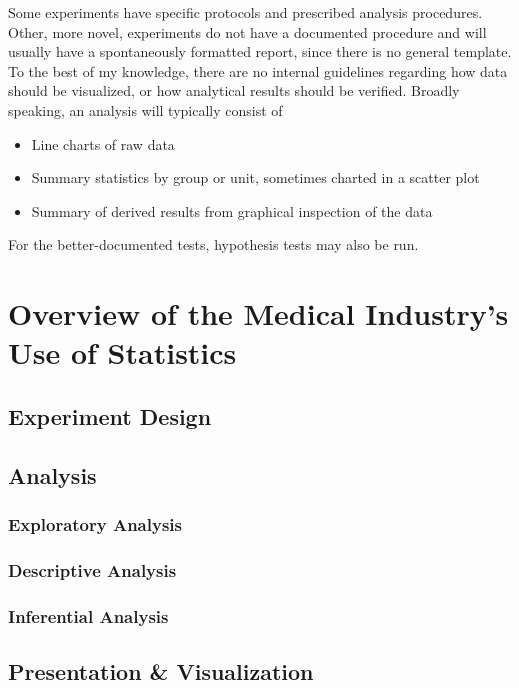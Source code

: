 \documentclass[11pt,a4paper,article]{memoir} %
\begin{document}
 Some experiments have specific protocols and prescribed analysis procedures. Other, more novel, experiments do not have a documented procedure and will usually have a spontaneously formatted report, since there is no general template.  To the best of my knowledge, there are no internal guidelines regarding how data should be visualized, or how analytical results should be verified. Broadly speaking, an analysis will typically consist of
 \begin{itemize}
 	\item Line charts of raw data
 	\item Summary statistics by group or unit, sometimes charted in a scatter plot
 	\item Summary of derived results from graphical inspection of the data
 \end{itemize}
 For the better-documented tests, hypothesis tests may also be run.
\par



\newpage
\chapter{Overview of the Medical Industry's Use of Statistics}\label{industry_context} %

\section{Experiment Design}

\section{Analysis}
\subsection{Exploratory Analysis}
\subsection{Descriptive Analysis}
\subsection{Inferential Analysis}

\section{Presentation \& Visualization}
\end{document}
